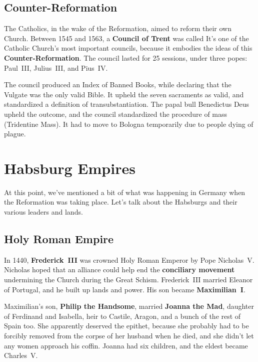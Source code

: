\subsection*{Counter-Reformation}

The Catholics, in the wake of the Reformation, aimed to reform their own Church.
Between 1545 and 1563, a \textbf{Council of Trent} was called
It's one of the Catholic Church's most important councils,
because it embodies the ideas of this \textbf{Counter-Reformation}.
The council lasted for 25 sessions, under three popes: Paul~III, Julius~III, and Pius~IV\@.

The council produced an Index of Banned Books,
while declaring that the Vulgate was the only valid Bible.
It upheld the seven sacraments as valid,
and standardized a definition of transubstantiation.
The papal bull Benedictus Deus upheld the outcome,
and the council standardized the procedure of mass (Tridentine Mass).
It had to move to Bologna temporarily due to people dying of plague.

\section{Habsburg Empires}

At this point, we've mentioned a bit of what was happening in Germany when the Reformation was taking place.
Let's talk about the Habsburgs and their various leaders and lands.

\subsection*{Holy Roman Empire}

In 1440, \textbf{Frederick~III} was crowned Holy Roman Emperor by Pope Nicholas~V.
Nicholas hoped that an alliance could help end the \textbf{conciliary movement}
undermining the Church during the Great Schism.
Frederick~III married Eleanor of Portugal, and he built up lands and power.
His son became \textbf{Maximilian~I}.

Maximilian's son, \textbf{Philip the Handsome},
married \textbf{Joanna the Mad}, daughter of Ferdinand and Isabella,
heir to Castile, Aragon, and a bunch of the rest of Spain too.
She apparently deserved the epithet,
because she probably had to be forcibly removed from the corpse of her husband when he died,
and she didn't let any women approach his coffin.
Joanna had six children, and the eldest became Charles~V.

